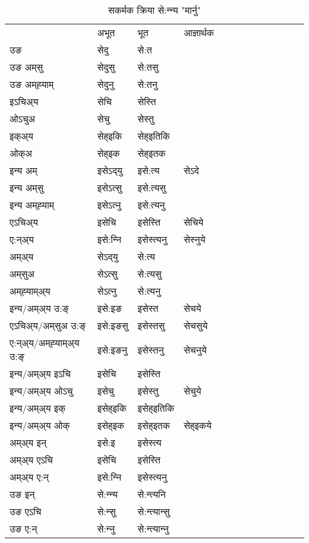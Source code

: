\begin{table}[H]
\centering
\caption{\label{et.vt} सकर्मक क्रिया  से:न्‍न्य  "मार्नु"  }
\begin{tabular}{l|l|l|l|l|l|l|l|l|l|l|l|l}  \toprule
&अभूत & भूत & आज्ञार्थक \\ 
उङ &सेदु &से:त \\ 
उङ अम्‌सु &सेदुसु &से:तसु \\ 
उङ अम्‌ह्‍याम् &सेदुनु &से:तनु \\ 
इऽचिअ्य &सेचि &सेस्ति   \\ 
ओऽचुअ &सेचु &सेस्तु   \\ 
इक्अ्य &सेह्इकि &सेह्इतिकि   \\ 
ओक्अ &सेह्इक &सेह्इतक   \\ 
इन्य अम् & इसेऽद्‌यु  & इसे:त्य &सेऽदे  \\ 
इन्य अम्‌सु & इसेऽत्सु  & इसे:त्यसु   \\ 
इन्य अम्‌ह्‍याम् & इसेऽत्‍नु  & इसे:त्यनु   \\ 
एऽचिअ्य & इसेचि & इसेस्ति &सेचिये    \\ 
ए:न्अ्य & इसे:न्‍नि  & इसेस्त्यनु &सेस्‍नुये  \\ 
अम्अ्य & सेऽद्‌यु  & से:त्य  \\ 
अम्‌सुअ & सेऽत्सु & से:त्यसु  \\ 
अम्‌ह्‍याम्अ्य & सेऽत्‍नु  & से:त्यनु \\ 
\midrule
इन्य/अम्अ्य उ:ङ्‌&इसे:इङ & इसेस्त &सेचये \\ 
एऽचिअ्य/अम्‌सुअ उ:ङ्‌ &इसे:इङसु & इसेस्तसु &सेचसुये \\ 
ए:न्अ्य/अम्‌ह्‍याम्अ्य उ:ङ्‌ &इसे:इङनु & इसेस्तनु &सेचनुये \\ 
इन्य/अम्अ्य इऽचि & इसेचि & इसेस्ति    \\ 
इन्य/अम्अ्य ओऽचु & इसेचु & इसेस्तु  &सेचुये  \\ 
इन्य/अम्अ्य इक् & इसेह्इकि & इसेह्इतिकि   \\ 
इन्य/अम्अ्य ओक् & इसेह्इक & इसेह्इतक  &सेह्इकये  \\ 
अम्अ्य इन् & इसे:इ & इसेस्त्य   \\ 
अम्अ्य एऽचि & इसेचि & इसेस्ति    \\ 
अम्अ्य ए:न् & इसे:न्‍नि  & इसेस्त्यनु  \\ 
\midrule
उङ इन् & से:न्‍न्य  & से:न्त्यनि  \\ 
उङ एऽचि & से:न्सु  & से:न्त्यान्सु   \\ 
उङ ए:न्& से:न्‍नु  & से:न्त्यान्‍नु   \\ 
\bottomrule
\end{tabular}
\end{table}


